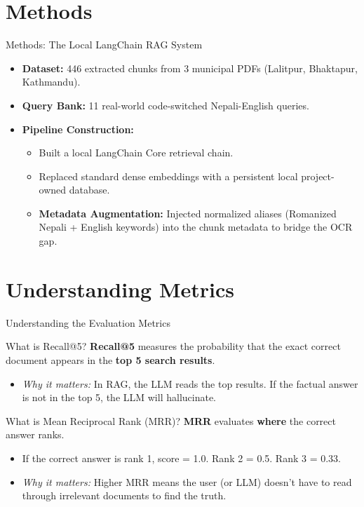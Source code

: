 \documentclass[11pt,aspectratio=169]{beamer}
\begin{document}
\section{Methods}
\begin{frame}{Methods: The Local LangChain RAG System}
    \begin{itemize}
        \item \textbf{Dataset:} 446 extracted chunks from 3 municipal PDFs (Lalitpur, Bhaktapur, Kathmandu).
        \item \textbf{Query Bank:} 11 real-world code-switched Nepali-English queries.
        \item \textbf{Pipeline Construction:} 
        \begin{itemize}
            \item Built a local LangChain Core retrieval chain.
            \item Replaced standard dense embeddings with a persistent local project-owned database.
            \item \textbf{Metadata Augmentation:} Injected normalized aliases (Romanized Nepali + English keywords) into the chunk metadata to bridge the OCR gap.
        \end{itemize}
    \end{itemize}
\end{frame}

\section{Understanding Metrics}
\begin{frame}{Understanding the Evaluation Metrics}
    \begin{block}{What is Recall@5?}
        \textbf{Recall@5} measures the probability that the exact correct document appears in the \textbf{top 5 search results}.
        \begin{itemize}
            \item \textit{Why it matters:} In RAG, the LLM reads the top results. If the factual answer is not in the top 5, the LLM will hallucinate.
        \end{itemize}
    \end{block}
    
    \vspace{0.3cm}
    \begin{block}{What is Mean Reciprocal Rank (MRR)?}
        \textbf{MRR} evaluates \textbf{where} the correct answer ranks.
        \begin{itemize}
            \item If the correct answer is rank 1, score = 1.0. Rank 2 = 0.5. Rank 3 = 0.33.
            \item \textit{Why it matters:} Higher MRR means the user (or LLM) doesn't have to read through irrelevant documents to find the truth.
        \end{itemize}
    \end{block}
\end{frame}
\end{document}
